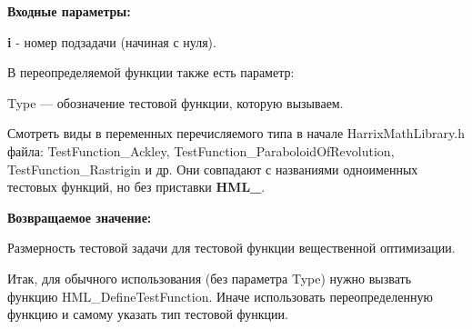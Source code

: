 \textbf{Входные параметры:}

\textbf{i} - номер подзадачи (начиная с нуля).

В переопределяемой функции также есть параметр:
  
Type --- обозначение тестовой функции, которую вызываем. 

Смотреть виды в переменных перечисляемого типа в начале HarrixMathLibrary.h файла: TestFunction\_Ackley, TestFunction\_ParaboloidOfRevolution, TestFunction\_Rastrigin и др. Они совпадают с названиями одноименных тестовых функций, но без приставки \textbf{HML\_}.

\textbf{Возвращаемое значение:}
 
Размерность тестовой задачи для тестовой функции вещественной оптимизации.

Итак, для обычного использования (без параметра Type) нужно вызвать функцию HML\_DefineTestFunction. Иначе использовать переопределенную функцию и самому указать тип тестовой функции.